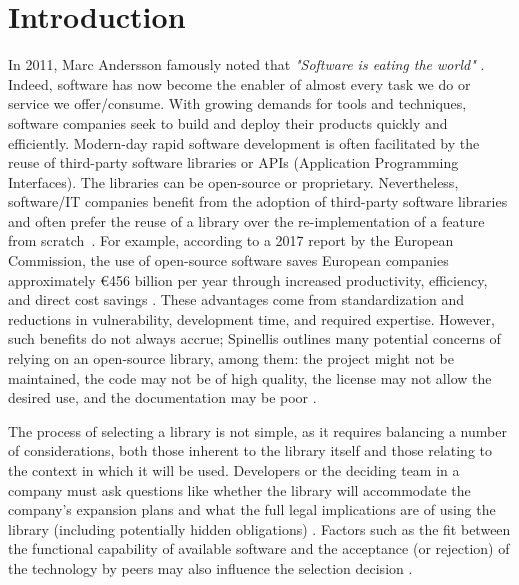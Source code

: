 \documentclass[manuscript,review,screen, table]{acmart}
\begin{document}
\maketitle
\section{Introduction}
In 2011, Marc Andersson famously noted that \textit{"Software is eating the world"} \cite{website:eat-world}. Indeed, software has now become the enabler of almost every task we do or service we offer/consume. With growing demands for tools and techniques, software companies seek to build and deploy their products quickly and efficiently. Modern-day rapid software development is often facilitated by the reuse of third-party software libraries or APIs (Application Programming Interfaces). The libraries can be open-source or proprietary. Nevertheless, software/IT companies benefit from the adoption of third-party software libraries and often prefer the reuse of a library over the re-implementation of a feature from scratch~\cite{uddin2017opiner}. For example, according to a 2017 report by the European Commission, the use of open-source software saves European companies approximately \euro456 billion per year through increased productivity, efficiency, and direct cost savings \cite{eu2017economic}. These advantages come from standardization and reductions in vulnerability, development time, and required expertise. However, such benefits do not always accrue; Spinellis outlines many potential concerns of relying on an open-source library, among them: the project might not be maintained, the code may not be of high quality, the license may not allow the desired use, and the documentation may be poor \cite{spinellis2019select}.

The process of selecting a library is not simple, as it requires balancing a number of considerations, both those inherent to the library itself and those relating to the context in which it will be used. Developers or the deciding team in a company must ask questions like whether the library will accommodate the company's expansion plans and what the full legal implications are of using the library (including potentially hidden obligations) 
\cite{spinellis2019select,wolter:2022:open}. Factors such as the fit between the functional capability of available software and the acceptance (or rejection) of the technology by peers may also influence the selection decision \cite{dishaw1998supporting,eckhardt2009influences}. %
\end{document}
